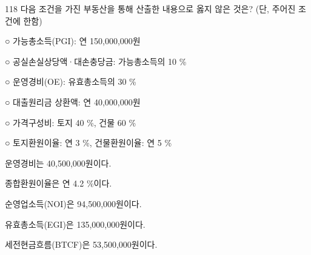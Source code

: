 \begin{question}{118}
다음 조건을 가진 부동산을 통해 산출한 내용으로 옳지 않은 것은? (단, 주어진 조건에 한함)
\begin{framedtext}
○ 가능총소득(PGI): 연 150,000,000원 \par
○ 공실손실상당액·대손충당금: 가능총소득의 10 \% \par
○ 운영경비(OE): 유효총소득의 30 \% \par
○ 대출원리금 상환액: 연 40,000,000원 \par
○ 가격구성비: 토지 40 \%, 건물 60 \% \par
○ 토지환원이율: 연 3 \%, 건물환원이율: 연 5 \% \par
\end{framedtext}
\begin{choices}
  \item 운영경비는 40,500,000원이다.
  \item 종합환원이율은 연 4.2 \%이다.
  \item 순영업소득(NOI)은 94,500,000원이다.
  \item 유효총소득(EGI)은 135,000,000원이다.
  \item 세전현금흐름(BTCF)은 53,500,000원이다.
\end{choices}
\end{question}
